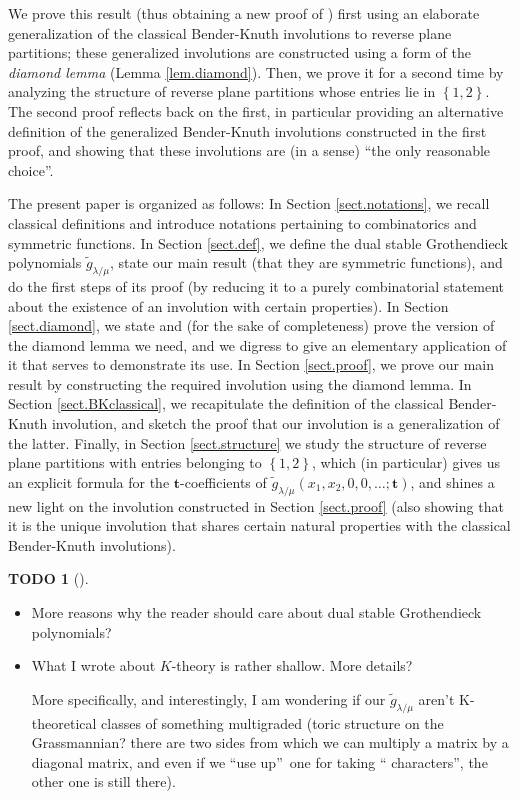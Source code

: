 \documentclass[numbers=enddot,12pt,final,onecolumn,notitlepage]{scrartcl}%
\theoremstyle{definition}
\newtheorem{quest}[theo]{TODO}
\newenvironment{todo}[1][]
{\begin{quest}[#1]\begin{leftbar}}
{\end{leftbar}\end{quest}}
\begin{document}
We prove this result (thus obtaining a new proof of \cite[Theorem 9.1]%
{LamPyl}) first using an elaborate generalization of the classical
Bender-Knuth involutions to reverse plane partitions; these generalized
involutions are constructed using a form of the \textit{diamond lemma} (Lemma
\ref{lem.diamond}).
Then, we prove it for a second time by analyzing the structure of reverse
plane partitions whose entries lie in $\left\{1, 2\right\}$. The second
proof reflects back on the first, in particular providing an
alternative definition of the generalized Bender-Knuth involutions
constructed in the first proof, and showing that these involutions
are (in a sense) ``the only reasonable choice''.

The present paper is organized as follows: In Section \ref{sect.notations}, we
recall classical definitions and introduce notations pertaining to
combinatorics and symmetric functions. In Section \ref{sect.def}, we define
the dual stable Grothendieck polynomials $\widetilde{g}_{\lambda/\mu}$, state
our main result (that they are symmetric functions), and do the first steps of
its proof (by reducing it to a purely combinatorial statement about the
existence of an involution with certain properties). In Section
\ref{sect.diamond}, we state and (for the sake of completeness) prove the
version of the diamond lemma we need, and we digress to give an elementary
application of it that serves to demonstrate its use. In Section
\ref{sect.proof}, we prove our main result by constructing the required
involution using the diamond lemma. In Section \ref{sect.BKclassical}, we
recapitulate the definition of the classical Bender-Knuth involution, and
sketch the proof that our involution is a generalization of the latter.
Finally, in Section \ref{sect.structure} we study the structure of
reverse plane partitions with entries belonging to $\left\{1, 2\right\}$,
which (in particular) gives us an explicit formula for the
$\mathbf{t}$-coefficients of
$\widetilde{g}_{\lambda/\mu}(x_1,x_2,0,0,\dots;\mathbf{t})$,
and shines a new light on the involution constructed in
Section \ref{sect.proof}
(also showing that it is the unique involution that shares certain natural
properties with the classical Bender-Knuth involutions).

\begin{todo}
\begin{itemize}
\item More reasons why the reader should
care about dual stable Grothendieck polynomials?

\item What I wrote about $K$-theory is rather shallow. More details?

More specifically, and interestingly, I am wondering if our $\widetilde{g}%
_{\lambda/\mu}$ aren't K-theoretical classes of something multigraded (toric
structure on the Grassmannian? there are two sides from which we can multiply
a matrix by a diagonal matrix, and even if we \textquotedblleft use
up\textquotedblright\ one for taking \textquotedblleft
characters\textquotedblright, the other one is still there).
\end{itemize}
\end{todo}
\end{document}
